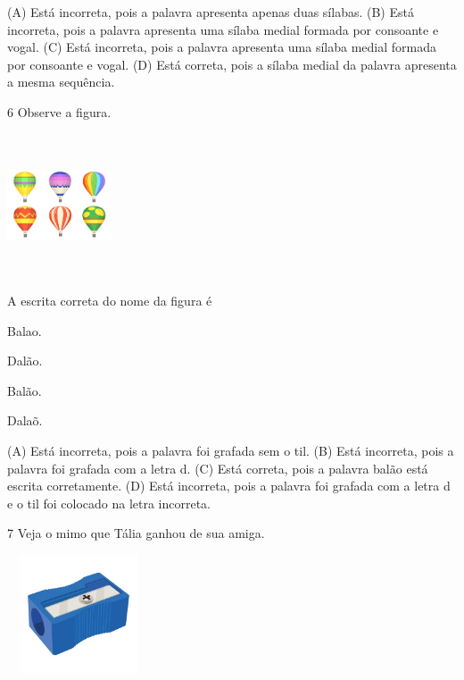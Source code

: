 (A) Está incorreta, pois a palavra apresenta apenas duas sílabas.
(B) Está incorreta, pois a palavra apresenta uma sílaba medial formada por consoante e vogal.
(C) Está incorreta, pois a palavra apresenta uma sílaba medial formada por consoante e vogal.
(D) Está correta, pois a sílaba medial da palavra apresenta a mesma sequência.

\num{6} Observe a figura.

\includegraphics[width=1.22569in,height=1.65417in]{media/image167.jpeg}


A escrita correta do nome da figura é

\begin{escolha}
\item Balao.

\item Dalão.

\item Balão.

\item Dalaõ.
\end{escolha}


(A) Está incorreta, pois a palavra foi grafada sem o til.
(B) Está incorreta, pois a palavra foi grafada com a letra d.
(C) Está correta, pois a palavra balão está escrita corretamente.
(D) Está incorreta, pois a palavra foi grafada com a letra d e o til foi colocado na letra incorreta.

\num{7} Veja o mimo que Tália ganhou de sua amiga.

\includegraphics[width=1.67273in,height=1.37251in]{media/image168.jpeg}

